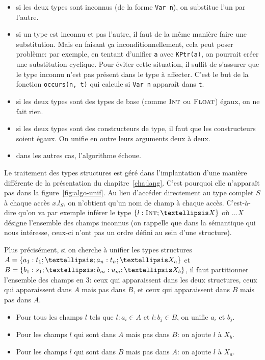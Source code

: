 \begin{itemize}

\item si les deux types sont inconnus (de la forme \texttt{Var n}), on substitue
l'un par l'autre.

\item si un type est inconnu et pas l'autre, il faut de la même manière faire
une substitution.
Mais en faisant ça inconditionnellement, cela peut poser problème:
par exemple, en tentant d'unifier \texttt{a} avec \verb!KPtr(a)!, on pourrait
créer une substitution cyclique.
Pour éviter cette situation, il suffit de s'assurer que le type inconnu n'est
pas présent dans le type à affecter. C'est le but de la fonction
\texttt{occurs(n, t)} qui calcule si \texttt{Var n} apparaît dans \texttt{t}.

\item si les deux types sont des types de base (comme $\textsc{Int}$ ou $\textsc{Float}$)
égaux, on ne fait rien.

\item si les deux types sont des constructeurs de type, il faut que les
constructeurs soient égaux. On unifie en outre leurs arguments deux à deux.

\item dans les autres cas, l'algorithme échoue.

\end{itemize}

Le traitement des types structures est géré dans l'implantation d'une manière
différente de la présentation du chapitre~\ref{cha:lang}. C'est pourquoi elle
n'apparaît pas dans la figure~\ref{fig:algo-unif}. Au lieu d'accéder directement
au type complet $S$ à chaque accès $x.l_S$, on n'obtient qu'un nom de champ à
chaque accès. C'est-à-dire qu'on va par exemple inférer le type $\tStruct{ l:
\tInt ; …X }$ où $…X$ désigne l'ensemble des champs inconnus (on rappelle que
dans la sémantique qui nous intéresse, ceux-ci n'ont pas un ordre défini au sein
d'une structure).

Plus précisément, si on cherche à unifier les types structures
$A = \tStruct{ a_1: t_1 ; … ; a_n: t_n; …X_a }$
et
$B = \tStruct{ b_1: s_1 ; … ; b_m: u_m; …X_b }$,
il faut partitionner l'ensemble des champs en 3: ceux qui apparaissent dans les
deux structures, ceux qui apparaissent dans $A$ mais pas dans $B$, et ceux qui
apparaissent dans $B$ mais pas dans $A$.

\begin{itemize}
    \item Pour tous les champs $l$ tels que $l: a_i ∈ A$ et $l: b_j ∈ B$,
        on unifie $a_i$ et $b_j$.
    \item Pour les champs $l$ qui sont dans $A$ mais pas dans $B$: on ajoute $l$
        à $X_b$.
    \item Pour les champs $l$ qui sont dans $B$ mais pas dans $A$: on ajoute $l$
        à $X_a$.
\end{itemize}

